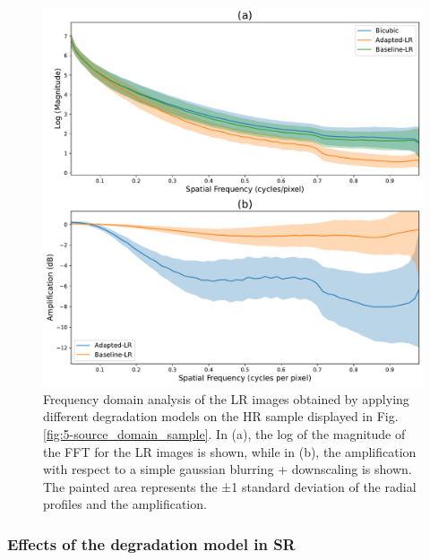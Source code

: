         \begin{figure}[H]
            \centering
            \includegraphics[scale=0.5]{Includes/5-source-lr-amplification-statistics.pdf}
            \caption{Frequency domain analysis of the LR images obtained by applying different degradation models on the HR sample displayed in Fig. \ref{fig:5-source_domain_sample}.
                     In (a), the log of the magnitude of the FFT for the LR images is shown,
                     while in (b), the amplification with respect to a  simple gaussian blurring + downscaling is shown.
                     The painted area represents the ±1 standard deviation of the radial profiles and the amplification. }
            \label{fig:5-lr-images-fft-comparison}
        \end{figure}




        \subsubsection{Effects of the degradation model in SR}

